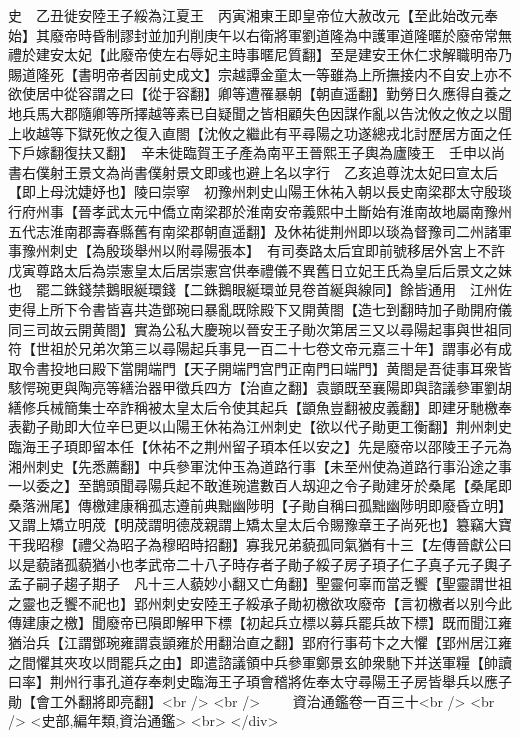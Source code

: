 史　乙丑徙安陸王子綏為江夏王　丙寅湘東王即皇帝位大赦改元【至此始改元奉始】其廢帝時昏制謬封並加刋削庚午以右衛將軍劉道隆為中護軍道隆暱於廢帝常無禮於建安太妃【此廢帝使左右辱妃主時事暱尼質翻】至是建安王休仁求解職明帝乃賜道隆死【書明帝者因前史成文】宗越譚金童太一等雖為上所撫接内不自安上亦不欲使居中從容謂之曰【從于容翻】卿等遭罹暴朝【朝直遥翻】勤勞日久應得自養之地兵馬大郡隨卿等所擇越等素已自疑聞之皆相顧失色因謀作亂以告沈攸之攸之以聞上收越等下獄死攸之復入直閤【沈攸之繼此有平尋陽之功遂總戎北討歷居方面之任下戶嫁翻復扶又翻】　辛未徙臨賀王子產為南平王晉熙王子輿為廬陵王　壬申以尚書右僕射王景文為尚書僕射景文即彧也避上名以字行　乙亥追尊沈太妃曰宣太后【即上母沈婕妤也】陵曰崇寧　初豫州刺史山陽王休祐入朝以長史南梁郡太守殷琰行府州事【晉孝武太元中僑立南梁郡於淮南安帝義熙中土斷始有淮南故地屬南豫州五代志淮南郡壽春縣舊有南梁郡朝直遥翻】及休祐徙荆州即以琰為督豫司二州諸軍事豫州刺史【為殷琰舉州以附尋陽張本】　有司奏路太后宜即前號移居外宮上不許戊寅尊路太后為崇憲皇太后居崇憲宫供奉禮儀不異舊日立妃王氏為皇后后景文之妹也　罷二銖錢禁鵝眼綖環錢【二銖鵝眼綖環並見卷首綖與線同】餘皆通用　江州佐吏得上所下令書皆喜共造鄧琬曰暴亂既除殿下又開黄閤【造七到翻時加子勛開府儀同三司故云開黄閤】實為公私大慶琬以晉安王子勛次第居三又以尋陽起事與世祖同符【世祖於兄弟次第三以尋陽起兵事見一百二十七卷文帝元嘉三十年】謂事必有成取令書投地曰殿下當開端門【天子開端門宫門正南門曰端門】黄閤是吾徒事耳衆皆駭愕琬更與陶亮等繕治器甲徵兵四方【治直之翻】袁顗既至襄陽即與諮議參軍劉胡繕修兵械簡集士卒詐稱被太皇太后令使其起兵【顗魚豈翻被皮義翻】即建牙馳檄奉表勸子勛即大位辛巳更以山陽王休祐為江州刺史【欲以代子勛更工衡翻】荆州刺史臨海王子頊即留本任【休祐不之荆州留子頊本任以安之】先是廢帝以邵陵王子元為湘州刺史【先悉薦翻】中兵參軍沈仲玉為道路行事【未至州使為道路行事沿途之事一以委之】至鵲頭聞尋陽兵起不敢進琬遣數百人刼迎之令子勛建牙於桑尾【桑尾即桑落洲尾】傳檄建康稱孤志遵前典黜幽陟明【子勛自稱曰孤黜幽陟明即廢昏立明】又謂上矯立明荗【明荗謂明德荗親謂上矯太皇太后令賜豫章王子尚死也】簒竊大寶干我昭穆【禮父為昭子為穆昭時招翻】寡我兄弟藐孤同氣猶有十三【左傳晉獻公曰以是藐諸孤藐猶小也孝武帝二十八子時存者子勛子綏子房子頊子仁子真子元子輿子孟子嗣子趨子期子　凡十三人藐妙小翻又亡角翻】聖靈何辜而當乏饗【聖靈謂世祖之靈也乏饗不祀也】郢州刺史安陸王子綏承子勛初檄欲攻廢帝【言初檄者以别今此傳建康之檄】聞廢帝已隕即解甲下標【初起兵立標以募兵罷兵故下標】既而聞江雍猶治兵【江謂鄧琬雍謂袁顗雍於用翻治直之翻】郢府行事苟卞之大懼【郢州居江雍之間懼其夾攻以問罷兵之由】即遣諮議領中兵參軍鄭景玄帥衆馳下并送軍糧【帥讀曰率】荆州行事孔道存奉刺史臨海王子頊會稽將佐奉太守尋陽王子房皆舉兵以應子勛【會工外翻將即亮翻】<br />
<br />
　　資治通鑑卷一百三十<br />
<br />
<史部,編年類,資治通鑑>  <br>
   </div> 

